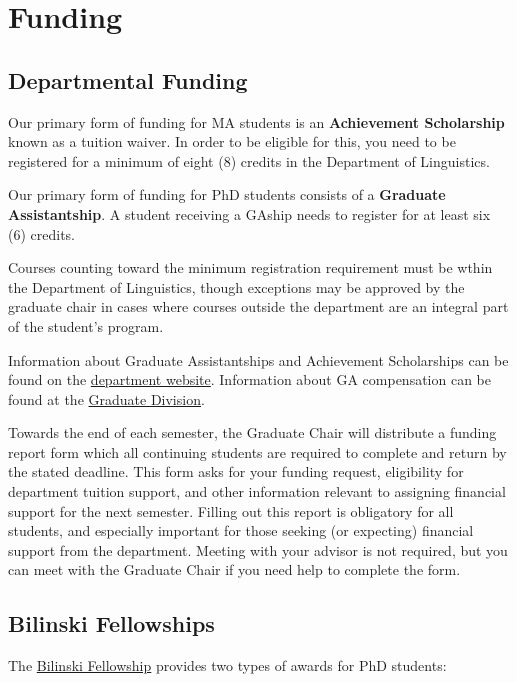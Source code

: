 \documentclass[
]{book}
\begin{document}
\chapter{Funding}\label{funding}

\section{Departmental Funding}\label{departmental-funding}

Our primary form of funding for MA students is an \textbf{Achievement Scholarship} known as a tuition waiver. In order to be eligible for this, you need to be registered for a minimum of eight (8) credits in the Department of Linguistics.

Our primary form of funding for PhD students consists of a \textbf{Graduate Assistantship}. A student receiving a GAship needs to register for at least six (6) credits.

Courses counting toward the minimum registration requirement must be wthin the Department of Linguistics, though exceptions may be approved by the graduate chair in cases where courses outside the department are an integral part of the student's program.

Information about Graduate Assistantships and Achievement Scholarships can be found on the \href{https://manoa.hawaii.edu/linguistics/funding/}{department website}. Information about GA compensation can be found at the \href{https://manoa.hawaii.edu/graduate/compensation-tax-withholding/}{Graduate Division}.

Towards the end of each semester, the Graduate Chair will distribute a funding report form which all continuing students are required to complete and return by the stated deadline. This form asks for your funding request, eligibility for department tuition support, and other information relevant to assigning financial support for the next semester. Filling out this report is obligatory for all students, and especially important for those seeking (or expecting) financial support from the department. Meeting with your advisor is not required, but you can meet with the Graduate Chair if you need help to complete the form.

\section{Bilinski Fellowships}\label{bilinski-fellowships}

The \href{https://manoa.hawaii.edu/linguistics/bilinski/}{Bilinski Fellowship} provides two types of awards for PhD students:
\end{document}
